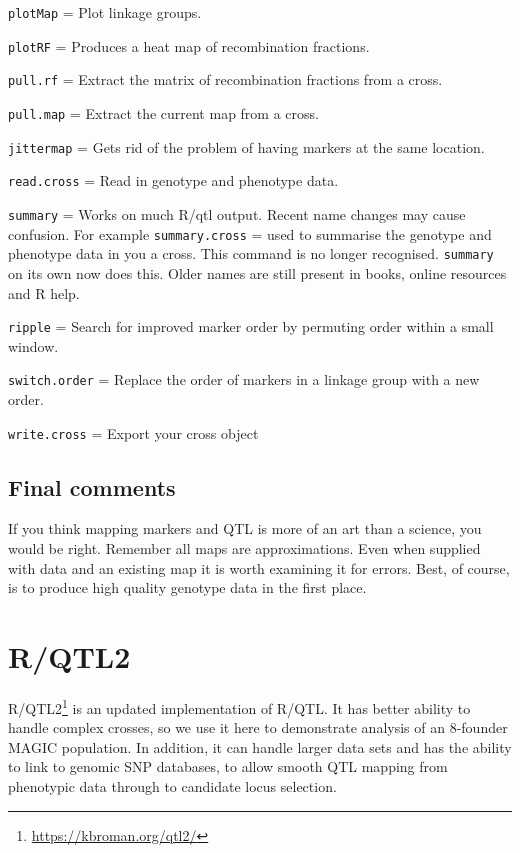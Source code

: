 \documentclass[
]{book}
\renewcommand{\href}[2]{#2\footnote{\url{#1}}}
\begin{document}
\texttt{plotMap} = Plot linkage groups.

\texttt{plotRF} = Produces a heat map of recombination fractions.

\texttt{pull.rf} = Extract the matrix of recombination fractions from a cross.

\texttt{pull.map} = Extract the current map from a cross.

\texttt{jittermap} = Gets rid of the problem of having markers at the same location.

\texttt{read.cross} = Read in genotype and phenotype data.

\texttt{summary} = Works on much R/qtl output. Recent name changes may cause confusion. For example \texttt{summary.cross} = used to summarise the genotype and phenotype data in you a cross. This command is no longer recognised. \texttt{summary} on its own now does this. Older names are still present in books, online resources and R help.

\texttt{ripple} = Search for improved marker order by permuting order within a small window.

\texttt{switch.order} = Replace the order of markers in a linkage group with a new order.

\texttt{write.cross} = Export your cross object

\hypertarget{final-comments}{%
\subsection{Final comments}\label{final-comments}}

If you think mapping markers and QTL is more of an art than a science, you would be right. Remember all maps are approximations. Even when supplied with data and an existing map it is worth examining it for errors. Best, of course, is to produce high quality genotype data in the first place.

\hypertarget{rqtl2}{%
\section{R/QTL2}\label{rqtl2}}

\href{https://kbroman.org/qtl2/}{R/QTL2} is an updated implementation of R/QTL. It has better ability to handle complex crosses, so we use it here to demonstrate analysis of an 8-founder MAGIC population. In addition, it can handle larger data sets and has the ability to link to genomic SNP databases, to allow smooth QTL mapping from phenotypic data through to candidate locus selection.
\end{document}
